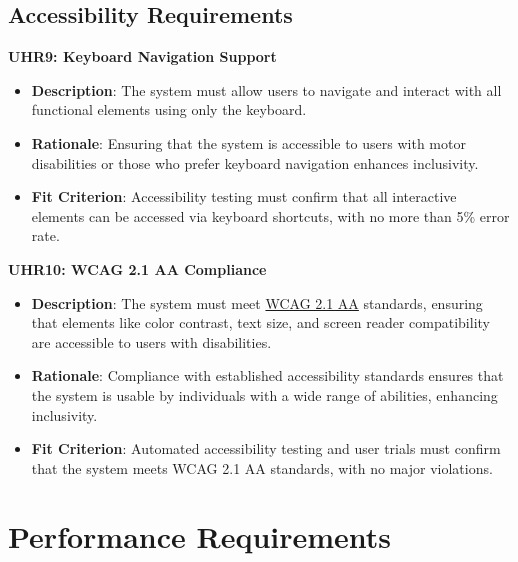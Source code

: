 \documentclass[12pt]{article}
\begin{document}
\subsection{Accessibility Requirements}
\textbf{UHR9: Keyboard Navigation Support}
\begin{itemize}
    \item \textbf{Description}: The system must allow users to navigate and
    interact with all functional elements using only the keyboard.
    \item \textbf{Rationale}: Ensuring that the system is accessible to users
    with motor disabilities or those who prefer keyboard navigation enhances
    inclusivity.
    \item \textbf{Fit Criterion}: Accessibility testing must confirm that all
    interactive elements can be accessed via keyboard shortcuts, with no more
    than 5\% error rate.
\end{itemize}
\textbf{UHR10: WCAG 2.1 AA Compliance}
\begin{itemize}
    \item \textbf{Description}: The system must meet
    \href{https://www.w3.org/TR/WCAG21/}{WCAG 2.1 AA} standards, ensuring that
    elements like color contrast, text size, and screen reader compatibility are
    accessible to users with disabilities.
    \item \textbf{Rationale}: Compliance with established accessibility
    standards ensures that the system is usable by individuals with a wide range
    of abilities, enhancing inclusivity.
    \item \textbf{Fit Criterion}: Automated accessibility testing and user
    trials must confirm that the system meets WCAG 2.1 AA standards, with no
    major violations.
\end{itemize}

\section{Performance Requirements}
\end{document}
